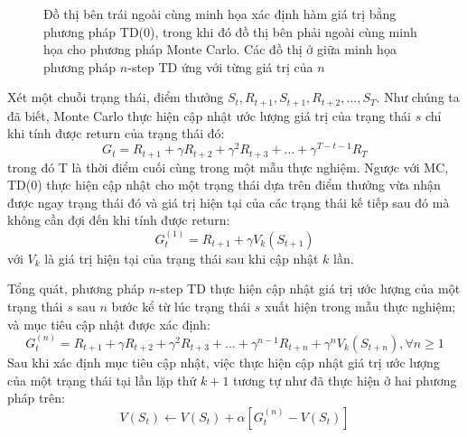 \begin{figure}
	\caption[Minh họa phương pháp $n$-step TD]{Đồ thị bên trái ngoài cùng minh họa xác định hàm giá trị bằng phương pháp TD(0), trong khi đó đồ thị bên phải ngoài cùng minh họa cho phương pháp Monte Carlo. Các đồ thị ở giữa minh họa phương pháp $n$-step TD ứng với từng giá trị của $n$}
	\label{fig:n_TD}
\end{figure}

Xét một chuỗi trạng thái, điểm thưởng $\mathit{S}_{t}, \mathit{R}_{t+1}, \mathit{S}_{t+1}, \mathit{R}_{t+2}, \dots, \mathit{S}_{T}$. Như chúng ta đã biết, Monte Carlo thực hiện cập nhật ước lượng giá trị của trạng thái $s$ chỉ khi tính được return của trạng thái đó:
\begin{equation*}
	G_{t} = \mathit{R}_{t+1} + \gamma \mathit{R}_{t+2} + \gamma^{2} \mathit{R}_{t+3} + \dots + \gamma^{T-t-1}\mathit{R}_T
\end{equation*}
trong đó T là thời điểm cuối cùng trong một mẫu thực nghiệm. Ngược với MC, TD(0) thực hiện cập nhật cho một trạng thái dựa trên điểm thưởng vừa nhận được ngay trạng thái đó và giá trị hiện tại của các trạng thái kế tiếp sau đó mà không cần đợi đến khi tính được return:
\begin{equation*}
G_{t}^{(1)} = \mathit{R}_{t+1} + \gamma V_{k}(\mathit{S}_{t+1}) 
\end{equation*}
với $V_k$ là giá trị hiện tại của trạng thái sau khi cập nhật $k$ lần.

Tổng quát, phương pháp $n$-step TD thực hiện cập nhật giá trị ước lượng của một trạng thái $s$ sau $n$ bước kể từ lúc trạng thái $s$ xuất hiện trong mẫu thực nghiệm; và mục tiêu cập nhật được xác định:
\begin{equation}
G_{t}^{(n)} = \mathit{R}_{t+1} + \gamma \mathit{R}_{t+2} + \gamma^2 \mathit{R}_{t+3} + \dots + \gamma^{n-1}\mathit{R}_{t+n} + \gamma^{n}V_{k}(\mathit{S}_{t+n}), \forall n \geq 1
\label{eq:n_TD_goal}
\end{equation}
Sau khi xác định mục tiêu cập nhật, việc thực hiện cập nhật giá trị ước lượng của một trạng thái tại lần lặp thứ $k + 1$ tương tự như đã thực hiện ở hai phương pháp trên:
\begin{equation*}
V(\mathit{S}_t) \leftarrow V(\mathit{S}_t) + \alpha \left[ G_{t}^{(n)} - V(\mathit{S}_t) \right]
\end{equation*}

